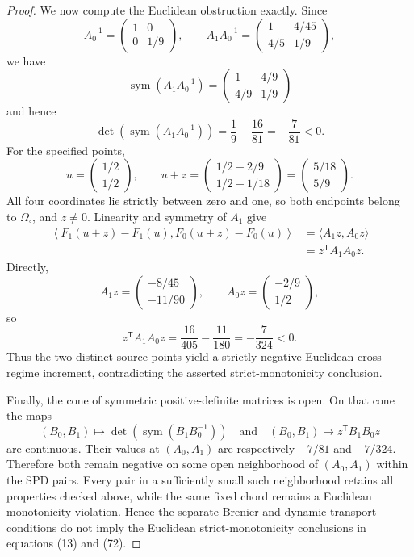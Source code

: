 \documentclass{article}
\begin{document}
\begin{proof}
We now compute the Euclidean obstruction exactly.  Since
\[
A_0^{-1}=\begin{pmatrix}1&0\\0&1/9\end{pmatrix},
\qquad
A_1A_0^{-1}
=\begin{pmatrix}1&4/45\\4/5&1/9\end{pmatrix},
\]
we have
\[
\operatorname{sym}(A_1A_0^{-1})
=\begin{pmatrix}1&4/9\\4/9&1/9\end{pmatrix}
\]
and hence
\[
\det\!\left(\operatorname{sym}(A_1A_0^{-1})\right)
=\frac19-\frac{16}{81}=-\frac7{81}<0.
\]
For the specified points,
\[
u=\begin{pmatrix}1/2\\1/2\end{pmatrix},
\qquad
u+z=\begin{pmatrix}1/2-2/9\\1/2+1/18\end{pmatrix}
=\begin{pmatrix}5/18\\5/9\end{pmatrix}.
\]
All four coordinates lie strictly between zero and one, so both endpoints belong to \(\Omega_{\square}\), and \(z\ne0\).  Linearity and symmetry of \(A_1\) give
\[
\begin{aligned}
\left\langle F_1(u+z)-F_1(u),F_0(u+z)-F_0(u)\right\rangle
&=\langle A_1z,A_0z\rangle\\
&=z^{\mathsf T}A_1A_0z.
\end{aligned}
\]
Directly,
\[
A_1z=\begin{pmatrix}-8/45\\-11/90\end{pmatrix},
\qquad
A_0z=\begin{pmatrix}-2/9\\1/2\end{pmatrix},
\]
so
\[
z^{\mathsf T}A_1A_0z
=\frac{16}{405}-\frac{11}{180}
=-\frac7{324}<0.
\]
Thus the two distinct source points yield a strictly negative Euclidean cross-regime increment, contradicting the asserted strict-monotonicity conclusion.

Finally, the cone of symmetric positive-definite matrices is open.  On that cone the maps
\[
(B_0,B_1)\longmapsto
\det\!\left(\operatorname{sym}(B_1B_0^{-1})\right)
\quad\text{and}\quad
(B_0,B_1)\longmapsto z^{\mathsf T}B_1B_0z
\]
are continuous.  Their values at \((A_0,A_1)\) are respectively \(-7/81\) and \(-7/324\).  Therefore both remain negative on some open neighborhood of \((A_0,A_1)\) within the SPD pairs.  Every pair in a sufficiently small such neighborhood retains all properties checked above, while the same fixed chord remains a Euclidean monotonicity violation.  Hence the separate Brenier and dynamic-transport conditions do not imply the Euclidean strict-monotonicity conclusions in equations (13) and (72).
\end{proof}
\end{document}
